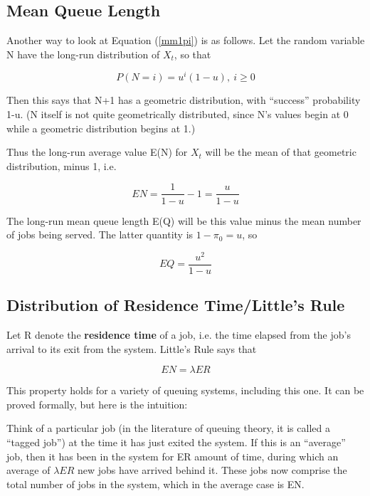 
\subsection{Mean Queue Length}
\label{meanqueuelength}

Another way to look at Equation (\ref{mm1pi}) is as follows.  Let the
random variable N have the long-run distribution of $X_{t}$, so that

\begin{equation}
P(N = i) = u^i (1-u), ~ i \geq 0
\end{equation}

Then this says that N+1 has a geometric distribution, with ``success''
probability 1-u.  (N itself is not quite geometrically distributed,
since N's values begin at 0 while a geometric distribution begins at 1.)

Thus the long-run average value E(N) for $X_t$ will be the mean of that
geometric distribution, minus 1, i.e. 

\begin{equation}
\label{nu}
EN = \frac{1}{1-u} - 1 = \frac{u}{1-u} 
\end{equation}

The long-run mean queue length E(Q) will be this value minus the mean
number of jobs being served.  The latter quantity is $1-\pi_0 = u$,
so 

\begin{equation}
\label{meanq}
EQ = \frac{u^2}{1-u}
\end{equation}

\subsection{Distribution of Residence Time/Little's Rule}

Let R denote the {\bf residence time} of a job, i.e. the time elapsed
from the job's arrival to its exit from the system.  Little's Rule says
that

\begin{equation}
EN = \lambda ER
\end{equation}

This property holds for a variety of queuing systems, including this
one.  It can be proved formally, but here is the intuition:

Think of a particular job (in the literature of queuing theory, it is
called a ``tagged job'') at the time it has just exited the system.  If
this is an ``average'' job, then it has been in the system for ER amount
of time, during which an average of $\lambda ER$ new jobs have arrived
behind it.  These jobs now comprise the total number of jobs in the
system, which in the average case is EN. 

